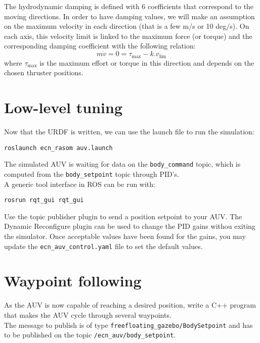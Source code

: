 \documentclass{ecnreport}
\begin{document}
The hydrodynamic damping is defined with 6 coefficients that correspond to the moving directions.
In order to have damping values, we will make an assumption on the maximum velocity in each direction (that is a few m/s or 10 deg/s).
On each axis, this velocity limit is linked to the maximum force (or torque) and the corresponding damping coefficient with the following relation:
\begin{equation*}
 m\dot v = 0 = \tau_{\max} - k.v_{\lim{}}
\end{equation*}where $\tau_{\max}$ is the maximum effort or torque in this direction and depends on the chosen thruster positions.


\section{Low-level tuning}

Now that the URDF is written, we can use the launch file to run the simulation:
\begin{center}
\begin{lstlisting}
roslaunch ecn_rasom auv.launch
\end{lstlisting}
\end{center}
The simulated AUV is waiting for data on the \texttt{body\_command} topic, which is computed from the \texttt{body\_setpoint} topic through PID's.\\
A generic tool interface in ROS can be run with:
\begin{center}
\begin{lstlisting}
rosrun rqt_gui rqt_gui
\end{lstlisting}
\end{center}
Use the topic publisher plugin to send a position setpoint to your AUV. The Dynamic Reconfigure plugin can be used to change the PID gains withou exiting the simulator.
Once acceptable values have been found for the gains, you may update the \texttt{ecn\_auv\_control.yaml} file to set the default values.

\section{Waypoint following}


As the AUV is now capable of reaching a desired position, write a C++ program that makes the AUV cycle through several waypoints. \\
The message to publish is of type \texttt{freefloating\_gazebo/BodySetpoint} and has to be published on the topic \texttt{/ecn\_auv/body\_setpoint}.
\end{document}
